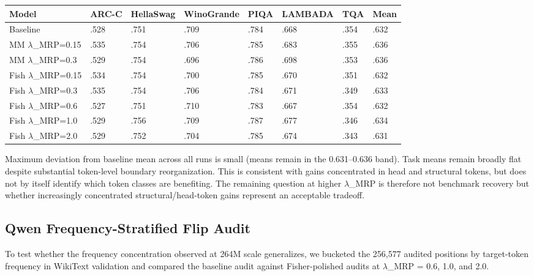 \documentclass[
  11pt,
]{article}
\begin{document}
\begin{longtable}[]{@{}llllllll@{}}
\toprule\noalign{}
Model & ARC-C & HellaSwag & WinoGrande & PIQA & LAMBADA & TQA & Mean \\
\midrule\noalign{}
\endhead
\bottomrule\noalign{}
\endlastfoot
Baseline & .528 & .751 & .709 & .784 & .668 & .354 & .632 \\
MM $\lambda$\_MRP=0.15 & .535 & .754 & .706 & .785 & .683 & .355 & .636 \\
MM $\lambda$\_MRP=0.3 & .529 & .754 & .696 & .786 & .698 & .353 & .636 \\
Fish $\lambda$\_MRP=0.15 & .534 & .754 & .700 & .785 & .670 & .351 & .632 \\
Fish $\lambda$\_MRP=0.3 & .535 & .754 & .706 & .784 & .671 & .349 & .633 \\
Fish $\lambda$\_MRP=0.6 & .527 & .751 & .710 & .783 & .667 & .354 & .632 \\
Fish $\lambda$\_MRP=1.0 & .529 & .756 & .709 & .787 & .677 & .346 & .634 \\
Fish $\lambda$\_MRP=2.0 & .529 & .752 & .704 & .785 & .674 & .343 & .631 \\
\end{longtable}

Maximum deviation from baseline mean across all runs is small (means
remain in the 0.631--0.636 band). Task means remain broadly flat despite
substantial token-level boundary reorganization. This is consistent with
gains concentrated in head and structural tokens, but does not by itself
identify which token classes are benefiting. The remaining question at
higher $\lambda$\_MRP is therefore not benchmark recovery but whether
increasingly concentrated structural/head-token gains represent an
acceptable tradeoff.

\hypertarget{qwen-frequency-stratified-flip-audit}{%
\subsection{Qwen Frequency-Stratified Flip
Audit}\label{qwen-frequency-stratified-flip-audit}}

To test whether the frequency concentration observed at 264M scale
generalizes, we bucketed the 256,577 audited positions by target-token
frequency in WikiText validation and compared the baseline audit against
Fisher-polished audits at $\lambda$\_MRP = 0.6, 1.0, and 2.0.
\end{document}
